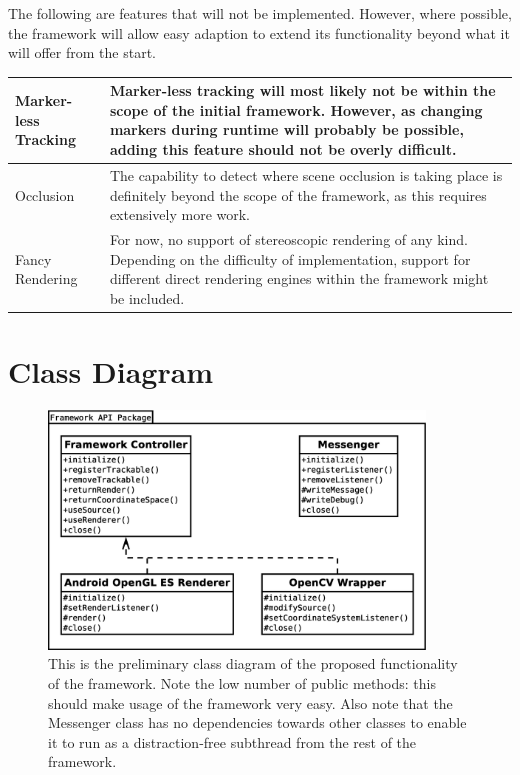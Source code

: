 The following are features that will not be implemented.
However, where possible, the framework will allow easy adaption to extend its functionality beyond what it will offer from the start.

\begin{tabulary}{\textwidth}{L || L}
Marker-less Tracking & Marker-less tracking will most likely not be within the scope of the initial framework. However, as changing markers during runtime will probably be possible, adding this feature should not be overly difficult.\\
\hline
Occlusion & The capability to detect where scene occlusion is taking place is definitely beyond the scope of the framework, as this requires extensively more work.\\
\hline
Fancy Rendering & For now, no support of stereoscopic rendering of any kind. Depending on the difficulty of implementation, support for different direct rendering engines within the framework might be included.\\
\end{tabulary}

\section{Class Diagram}

\begin{figure}
	\centering
	\includegraphics[width=10cm]{img/class_diagram.eps}
	\caption[General Class Diagram]{This is the preliminary class diagram of the proposed functionality of the framework. Note the low number of public methods: this should make usage of the framework very easy. Also note that the Messenger class has no dependencies towards other classes to enable it to run as a distraction-free subthread from the rest of the framework.}
	\label{fig:class_diagram}
\end{figure}

